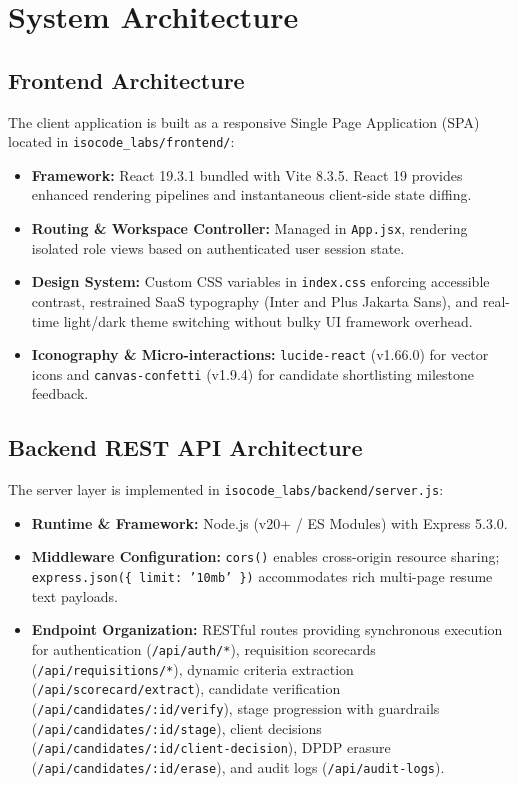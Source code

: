\documentclass[11pt,a4paper,oneside]{report}
\begin{document}
\chapter{System Architecture}

\section{Frontend Architecture}
The client application is built as a responsive Single Page Application (SPA) located in \texttt{isocode\_labs/frontend/}:
\begin{itemize}[leftmargin=1.5em]
    \item \textbf{Framework:} React 19.3.1 bundled with Vite 8.3.5. React 19 provides enhanced rendering pipelines and instantaneous client-side state diffing.
    \item \textbf{Routing \& Workspace Controller:} Managed in \texttt{App.jsx}, rendering isolated role views based on authenticated user session state.
    \item \textbf{Design System:} Custom CSS variables in \texttt{index.css} enforcing accessible contrast, restrained SaaS typography (\textsf{Inter} and \textsf{Plus Jakarta Sans}), and real-time light/dark theme switching without bulky UI framework overhead.
    \item \textbf{Iconography \& Micro-interactions:} \texttt{lucide-react} (v1.66.0) for vector icons and \texttt{canvas-confetti} (v1.9.4) for candidate shortlisting milestone feedback.
\end{itemize}

\section{Backend REST API Architecture}
The server layer is implemented in \texttt{isocode\_labs/backend/server.js}:
\begin{itemize}[leftmargin=1.5em]
    \item \textbf{Runtime \& Framework:} Node.js (v20+ / ES Modules) with Express 5.3.0.
    \item \textbf{Middleware Configuration:} \texttt{cors()} enables cross-origin resource sharing; \texttt{express.json(\{ limit: '10mb' \})} accommodates rich multi-page resume text payloads.
    \item \textbf{Endpoint Organization:} RESTful routes providing synchronous execution for authentication (\texttt{/api/auth/*}), requisition scorecards (\texttt{/api/requisitions/*}), dynamic criteria extraction (\texttt{/api/scorecard/extract}), candidate verification (\texttt{/api/candidates/:id/verify}), stage progression with guardrails (\texttt{/api/candidates/:id/stage}), client decisions (\texttt{/api/candidates/:id/client-decision}), DPDP erasure (\texttt{/api/candidates/:id/erase}), and audit logs (\texttt{/api/audit-logs}).
\end{itemize}
\end{document}
